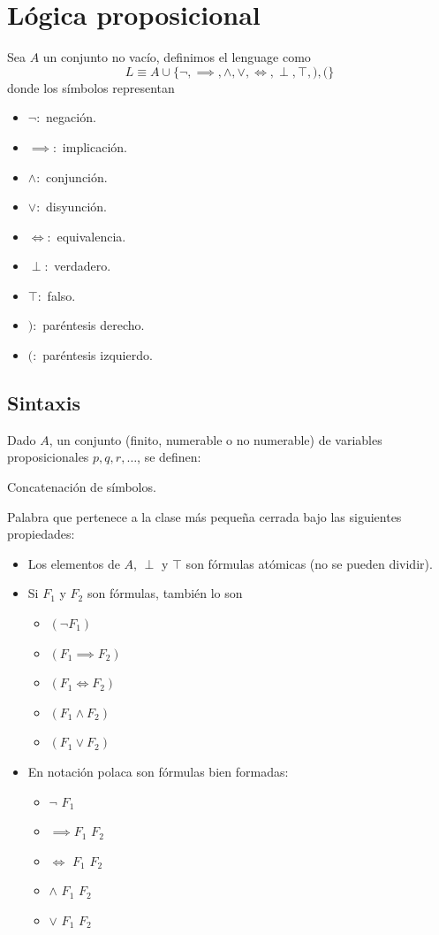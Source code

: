 \section{Lógica proposicional}
Sea $A$ un conjunto no vacío, definimos el lenguage como
$$L \equiv A\cup\{\neg,\implies, \wedge, \vee, \iff, \perp, \top, ), ( \}$$
donde los símbolos representan
\begin{itemize}
	\item $\neg:$ negación.
	\item $\implies:$ implicación.
	\item $\wedge:$ conjunción.
	\item $\vee:$ disyunción.
	\item $\iff:$ equivalencia.
	\item $\perp:$ verdadero.
	\item $\top:$ falso.
	\item $):$ paréntesis derecho.
	\item $(:$ paréntesis izquierdo.
\end{itemize}

\subsection{Sintaxis}
Dado $A$, un conjunto (finito, numerable o no numerable) de variables proposicionales $p, q, r, \hdots$, se definen:

\begin{defn}[Palabra]
	Concatenación de símbolos.
\end{defn}

\begin{defn}
	Palabra que pertenece a la clase más pequeña cerrada bajo las siguientes propiedades:
	\begin{itemize}
		\item Los elementos de $A$, $\perp$ y $\top$ son fórmulas atómicas (no se pueden dividir).
		\item Si $F_1$ y $F_2$ son fórmulas, también lo son
		\begin{itemize}
			\item $(\neg F_1)$
			\item $(F_1\implies F_2)$
			\item $(F_1\iff F_2)$
			\item $(F_1\wedge F_2)$
			\item $(F_1\vee F_2)$
		\end{itemize}
		\newpage
		\item En notación polaca son fórmulas bien formadas:
		\begin{itemize}
			\item $\neg$ $F_1$
			\item $\implies F_1$ $F_2$
			\item $\iff$ $F_1$ $F_2$
			\item $\wedge$ $F_1$ $F_2$
			\item $\vee$ $F_1$ $F_2$
		\end{itemize}
	\end{itemize}
\end{defn}


